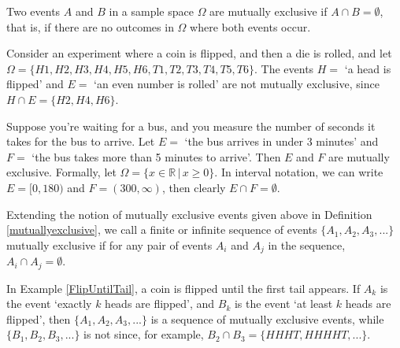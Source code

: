 \begin{definition}\label{mutuallyexclusive}
Two events $A$ and $B$ in a sample space $\Omega$ are mutually exclusive if $A \cap B = \emptyset$, that is, if there are no outcomes in $\Omega$ where both events occur.
\end{definition}
\begin{examp}
Consider an experiment where a coin is flipped, and then a die is rolled, and let $\Omega = \{H1,H2,H3,H4,H5,H6,T1,T2,T3,T4,T5,T6\}$. The events $H =$ `a head is flipped' and $E =$ `an even number is rolled' are not mutually exclusive, since $H \cap E = \{H2, H4, H6\}$.
\end{examp}
\begin{examp}
Suppose you're waiting for a bus, and you measure the number of seconds it takes for the bus to arrive. Let $E =$ `the bus arrives in under 3 minutes' and $F =$ `the bus takes more than 5 minutes to arrive'. Then $E$ and $F$ are mutually exclusive. Formally, let $\Omega = \{ x \in \mathbb{R} \, | \, x \geq 0\}$. In interval notation, we can write $E = [0,180)$ and $F = (300,\infty)$, then clearly $E \cap F = \emptyset$.
\end{examp}
\par
Extending the notion of mutually exclusive events given above in Definition \ref{mutuallyexclusive}, we call a finite or infinite sequence of events $\{A_1, A_2, A_3, ...\}$ mutually exclusive if for any pair of events $A_i$ and $A_j$ in the sequence, $A_i \cap A_j = \emptyset$.
\begin{examp}
In Example \ref{FlipUntilTail}, a coin is flipped until the first tail appears. If $A_k$ is the event `exactly $k$ heads are flipped', and $B_k$ is the event `at least $k$ heads are flipped', then $\{A_1, A_2, A_3, ...\}$ is a sequence of mutually exclusive events, while $\{B_1, B_2, B_3, ...\}$ is not since, for example, $B_2 \cap B_3 = \{HHHT, HHHHT, ...\}$.
\end{examp}





